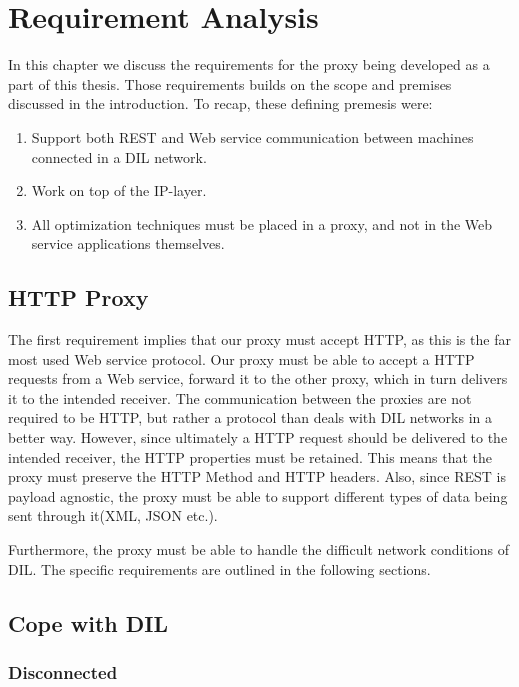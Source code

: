\chapter{Requirement Analysis}

In this chapter we discuss the requirements for the proxy being developed as a
part of this thesis. Those requirements builds on the scope and premises
discussed in the introduction. To recap, these defining premesis were:

\begin{enumerate}
    \item Support both REST and Web service communication between machines connected in a DIL network.
    \item Work on top of the IP-layer.
    \item All optimization techniques must be placed in a proxy, and not in the Web service applications themselves.
\end{enumerate}

\section{HTTP Proxy}

The first requirement implies that our proxy must accept HTTP, as this is the
far most used Web service protocol. Our proxy must be able to accept a HTTP
requests from a Web service, forward it to the other proxy, which in turn
delivers it to the intended receiver. The communication between the proxies are
not required to be HTTP, but rather a protocol than deals with DIL networks in a
better way. However, since ultimately a HTTP request should be delivered to the
intended receiver, the HTTP properties must be retained. This means that the
proxy must preserve the HTTP Method and HTTP headers. Also, since REST is
payload agnostic, the proxy must be able to support different types of data
being sent through it(XML, JSON etc.).

Furthermore, the proxy must be able to handle the difficult network conditions
of DIL. The specific requirements are outlined in the following sections.

\section{Cope with DIL}

\subsection{Disconnected}

